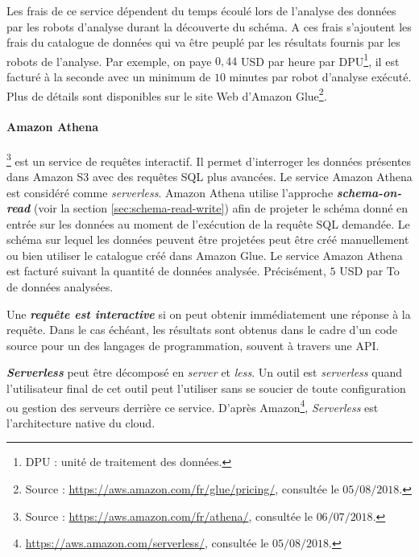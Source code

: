 Les frais de ce service dépendent du temps écoulé lors de l'analyse des données par les robots d'analyse durant la découverte du schéma. A ces frais s'ajoutent les frais du catalogue de données qui va être peuplé par les résultats fournis par les robots de l'analyse. Par exemple, on paye $ 0,44 $ USD par heure par DPU\footnote{DPU : unité de traitement des données.}, il est facturé à la seconde avec un minimum de $ 10 $ minutes par robot d'analyse exécuté. Plus de détails sont disponibles sur le site Web d'Amazon Glue\footnote{Source : \url{https://aws.amazon.com/fr/glue/pricing/}, consultée le $05/08/2018$.}.

\paragraph{Amazon Athena}\label{aws:athena}\footnote{Source : \url{https://aws.amazon.com/fr/athena/}, consultée le $06/07/2018$.} est un service de requêtes  interactif. Il permet d'interroger les données présentes dans Amazon S3 avec des requêtes SQL plus avancées. Le service Amazon Athena est considéré comme \textit{serverless}. Amazon Athena utilise l'approche \textbf{\textit{schema-on-read}} (voir la section \ref{sec:schema-read-write}) afin de projeter le schéma donné en entrée sur les données au moment de l'exécution de la requête SQL demandée. Le schéma sur lequel les données peuvent être projetées peut être créé manuellement ou bien utiliser le catalogue créé dans Amazon Glue.
Le service Amazon Athena est facturé suivant la quantité de données analysée. Précisément, $ 5 $ USD par To de données analysées.


\begin{tcolorbox}
	Une \textbf{\textit{requête est	interactive}} si on peut  obtenir immédiatement une réponse à la requête.  Dans le cas échéant, les résultats sont obtenus  dans le cadre d'un code source pour un des langages de programmation, souvent à travers une API.
\end{tcolorbox}

\begin{tcolorbox}
	\textbf{\textit{Serverless}} peut être décomposé en \textit{server} et \textit{less}. Un outil est \textit{serverless} quand l'utilisateur final de cet outil peut l'utiliser sans se soucier de toute configuration ou gestion des serveurs derrière ce service. D'après Amazon\footnote{\url{https://aws.amazon.com/serverless/}, consultée le  $05/08/2018$.},  \textit{Serverless} est l'architecture native du cloud.
\end{tcolorbox}

